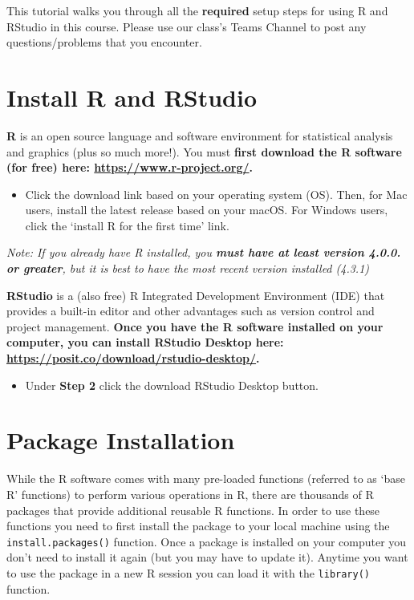 \documentclass[
]{book}
\providecommand{\tightlist}{%
  \setlength{\itemsep}{0pt}\setlength{\parskip}{0pt}}
\begin{document}
This tutorial walks you through all the \textbf{required} setup steps for using R and RStudio in this course. Please use our class's Teams Channel to post any questions/problems that you encounter.

\hypertarget{install-r-and-rstudio}{%
\section{Install R and RStudio}\label{install-r-and-rstudio}}

\textbf{R} is an open source language and software environment for statistical analysis and graphics (plus so much more!). You must \textbf{first download the R software (for free) here: \url{https://www.r-project.org/}.}

\begin{itemize}
\tightlist
\item
  Click the download link based on your operating system (OS). Then, for Mac users, install the latest release based on your macOS. For Windows users, click the `install R for the first time' link.
\end{itemize}

\emph{Note: If you already have R installed, you \textbf{must have at least version 4.0.0. or greater}, but it is best to have the most recent version installed (4.3.1)}

\textbf{RStudio} is a (also free) R Integrated Development Environment (IDE) that provides a built-in editor and other advantages such as version control and project management. \textbf{Once you have the R software installed on your computer, you can install RStudio Desktop here: \url{https://posit.co/download/rstudio-desktop/}.}

\begin{itemize}
\tightlist
\item
  Under \textbf{Step 2} click the download RStudio Desktop button.
\end{itemize}

\hypertarget{package-installation}{%
\section{Package Installation}\label{package-installation}}

While the R software comes with many pre-loaded functions (referred to as `base R' functions) to perform various operations in R, there are thousands of R packages that provide additional reusable R functions. In order to use these functions you need to first install the package to your local machine using the \texttt{install.packages()} function. Once a package is installed on your computer you don't need to install it again (but you may have to update it). Anytime you want to use the package in a new R session you can load it with the \texttt{library()} function.
\end{document}
